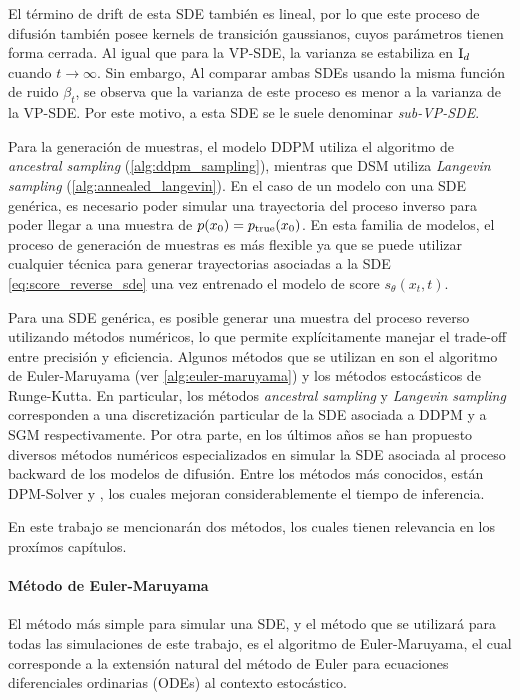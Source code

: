 El término de drift de esta SDE también es lineal, por lo que este proceso de difusión también posee kernels de transición gaussianos, cuyos parámetros tienen forma cerrada. Al igual que para la VP-SDE, la varianza se estabiliza en $\operatorname{I}_{d}$ cuando $t\to\infty$. Sin embargo, Al comparar ambas SDEs usando la misma función de ruido $\beta_t$, se observa que la varianza de este proceso es menor a la varianza de la VP-SDE. Por este motivo, a esta SDE se le suele denominar \textit{sub-VP-SDE}.

Para la generación de muestras, el modelo DDPM utiliza el algoritmo de \textit{ancestral sampling} (\autoref{alg:ddpm_sampling}), mientras que DSM utiliza \textit{Langevin sampling} (\autoref{alg:annealed_langevin}). En el caso de un modelo con una SDE genérica, es necesario poder simular una trayectoria del proceso inverso para poder llegar a una muestra de $p(x_0)=p_{\operatorname{true}}(x_0)$. En esta familia de modelos, el proceso de generación de muestras es más flexible ya que se puede utilizar cualquier técnica para generar trayectorias asociadas a la SDE \eqref{eq:score_reverse_sde} una vez entrenado el modelo de score $s_\theta(x_t,t)$.

Para una SDE genérica, es posible generar una muestra del proceso reverso utilizando métodos numéricos, lo que permite explícitamente manejar el trade-off entre precisión y eficiencia. Algunos métodos que se utilizan en \cite{song2021scorebased} son el algoritmo de Euler-Maruyama (ver \autoref{alg:euler-maruyama}) y los métodos estocásticos de Runge-Kutta. En particular, los métodos \textit{ancestral sampling} y \textit{Langevin sampling} corresponden a una discretización particular de la SDE asociada a DDPM y a SGM respectivamente. Por otra parte, en los últimos años se han propuesto diversos métodos numéricos especializados en simular la SDE asociada al proceso backward de los modelos de difusión. Entre los métodos más conocidos, están DPM-Solver \cite{lu2022dpmsolverfastodesolver} y \cite{lu2023dpmsolverfastsolverguided}, los cuales mejoran considerablemente el tiempo de inferencia.

En este trabajo se mencionarán dos métodos, los cuales tienen relevancia en los proxímos capítulos.

\paragraph{Método de Euler-Maruyama}

El método más simple para simular una SDE, y el método que se utilizará para todas las simulaciones de este trabajo, es el algoritmo de Euler-Maruyama, el cual corresponde a la extensión natural del método de Euler para ecuaciones diferenciales ordinarias (ODEs) al contexto estocástico.

